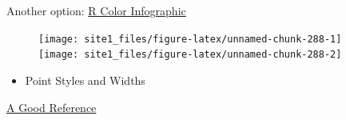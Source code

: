 \documentclass[]{book}
\newenvironment{Shaded}{\begin{snugshade}}{\end{snugshade}}
\newcommand{\KeywordTok}[1]{\textcolor[rgb]{0.13,0.29,0.53}{\textbf{#1}}}
\newcommand{\DataTypeTok}[1]{\textcolor[rgb]{0.13,0.29,0.53}{#1}}
\newcommand{\DecValTok}[1]{\textcolor[rgb]{0.00,0.00,0.81}{#1}}
\newcommand{\StringTok}[1]{\textcolor[rgb]{0.31,0.60,0.02}{#1}}
\newcommand{\CommentTok}[1]{\textcolor[rgb]{0.56,0.35,0.01}{\textit{#1}}}
\newcommand{\OperatorTok}[1]{\textcolor[rgb]{0.81,0.36,0.00}{\textbf{#1}}}
\newcommand{\NormalTok}[1]{#1}
\providecommand{\tightlist}{%
  \setlength{\itemsep}{0pt}\setlength{\parskip}{0pt}}
\begin{document}
Another option:
\href{http://research.stowers-institute.org/efg/R/Color/Chart/ColorsChart1.jpg}{R
Color Infographic}

\begin{Shaded}
\end{Shaded}

\begin{figure}

{\centering \texttt{[image: site1\_files/figure-latex/unnamed-chunk-288-1]} \texttt{[image: site1\_files/figure-latex/unnamed-chunk-288-2]} 

}

\caption{ }\label{fig:unnamed-chunk-288}
\end{figure}

\begin{itemize}
\tightlist
\item
  Point Styles and Widths
\end{itemize}

\href{http://www.endmemo.com/program/R/pic/pchsymbols.png}{A Good
Reference}
\end{document}
